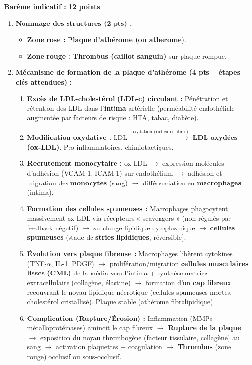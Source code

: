 \documentclass[11pt]{article}
\begin{document}
\begin{corrige}
\textbf{Barème indicatif : 12 points}
\begin{enumerate}
    \item \textbf{Nommage des structures (2 pts) :}
    \begin{itemize}
        \item \textbf{Zone rose :} \textbf{Plaque d'athérome (ou atherome)}.
        \item \textbf{Zone rouge :} \textbf{Thrombus (caillot sanguin)} sur plaque rompue.
    \end{itemize}
    \item \textbf{Mécanisme de formation de la plaque d'athérome (4 pts -- étapes clés attendues) :}
    \begin{enumerate}
        \item \textbf{Excès de LDL-cholestérol (LDL-c) circulant :} Pénétration et rétention des LDL dans l'\textbf{intima} artérielle (perméabilité endothéliale augmentée par facteurs de risque : HTA, tabac, diabète).
        \item \textbf{Modification oxydative :} LDL $\xrightarrow{\text{oxydation (radicaux libres)}}$ \textbf{LDL oxydées (ox-LDL)}. Pro-inflammatoires, chimiotactiques.
        \item \textbf{Recrutement monocytaire :} ox-LDL $\to$ expression molécules d'adhésion (VCAM-1, ICAM-1) sur endothélium $\to$ adhésion et migration des \textbf{monocytes} (sang) $\to$ différenciation en \textbf{macrophages} (intima).
        \item \textbf{Formation des cellules spumeuses :} Macrophages phagocytent massivement ox-LDL via récepteurs « scavengers » (non régulés par feedback négatif) $\to$ surcharge lipidique cytoplasmique $\to$ \textbf{cellules spumeuses} (stade de \textbf{stries lipidiques}, réversible).
        \item \textbf{Évolution vers plaque fibreuse :} Macrophages libèrent cytokines (TNF-$\alpha$, IL-1, PDGF) $\to$ prolifération/migration \textbf{cellules musculaires lisses (CML)} de la média vers l'intima + synthèse matrice extracellulaire (collagène, élastine) $\to$ formation d'un \textbf{cap fibreux} recouvrant le noyau lipidique nécrotique (cellules spumeuses mortes, cholestérol cristallisé). Plaque stable (athérome fibrolipidique).
        \item \textbf{Complication (Rupture/Érosion) :} Inflammation (MMPs -- métalloprotéinases) amincit le cap fibreux $\to$ \textbf{Rupture de la plaque} $\to$ exposition du noyau thrombogène (facteur tissulaire, collagène) au sang $\to$ activation plaquettes + coagulation $\to$ \textbf{Thrombus} (zone rouge) occlusif ou sous-occlusif.

\end{enumerate}
\end{enumerate}
\end{corrige}
\end{document}
